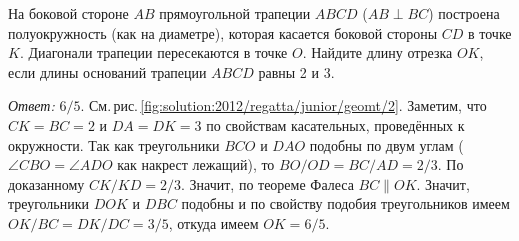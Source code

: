 \problem
На боковой стороне $AB$ прямоугольной трапеции $ABCD$ ($AB \perp BC$)
построена полуокружность (как на диаметре), которая касается боковой стороны
$CD$ в точке $K$.
Диагонали трапеции пересекаются в точке $O$.
Найдите длину отрезка $OK$, если длины оснований трапеции $ABCD$ равны 2 и 3.

%
\label{solution:2012/regatta/junior/geomt/2}%
\emph{Ответ:} $6 / 5$.
См.\,рис.\,\ref{fig:solution:2012/regatta/junior/geomt/2}.
Заметим, что $CK = BC = 2$ и $DA = DK = 3$ по свойствам касательных,
проведённых к окружности.
Так как треугольники $BCO$ и $DAO$ подобны по двум углам
($\angle CBO = \angle ADO$ как накрест лежащий),
то $BO / OD = BC / AD = 2 / 3$.
По доказанному $CK / KD = 2 / 3$.
Значит, по теореме Фалеса $BC \parallel OK$.
Значит, треугольники $DOK$ и $DBC$ подобны и по свойству подобия треугольников
имеем $OK / BC = DK / DC = 3 / 5$, откуда имеем $OK = 6 / 5$.

\endproblem
